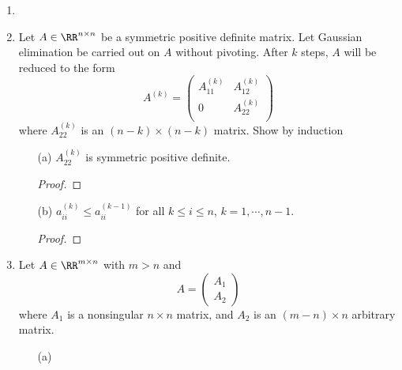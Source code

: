 \documentclass[11pt]{article}
\begin{document}
\begin{enumerate}
        \begin{proof}
            
        \end{proof}

    \item %

    \item %
        Let $A \in \RR^{n \times n}$ be a symmetric positive definite matrix.
        Let Gaussian elimination be carried out on $A$ without pivoting.
        After $k$ steps, $A$ will be reduced to the form
        \[
            A^{(k)} =
            \begin{pmatrix}
                A_{11}^{(k)} & A_{12}^{(k)} \\
                0            & A_{22}^{(k)} \\
            \end{pmatrix}
        \]
        where $A_{22}^{(k)}$ is an $(n - k) \times (n - k)$ matrix.
        Show by induction
        \begin{enumerate}
            \item[(a)]
                $A_{22}^{(k)}$ is symmetric positive definite.

                \begin{proof}
                    
                \end{proof}

            \item[(b)]
                $a_{ii}^{(k)} \le a_{ii}^{(k-1)}$ for all $k \le i \le n$,
                $k = 1, \cdots, n - 1$.

                \begin{proof}
                    
                \end{proof}
        \end{enumerate}

    \item %
        Let $A \in \RR^{m \times n}$ with $m > n$ and
        \[
            A = 
            \begin{pmatrix}
                A_1 \\
                A_2
            \end{pmatrix}
        \]
        where $A_1$ is a nonsingular $n \times n$ matrix, and $A_2$ is an
        $(m - n) \times n$ arbitrary matrix.
        \begin{enumerate}
            \item[(a)]


\end{enumerate}
\end{enumerate}
\end{document}
